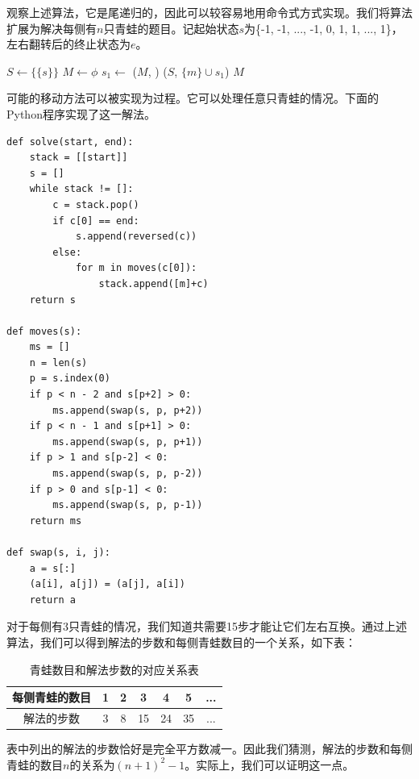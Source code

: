 \documentclass[b5paper]{ctexart}
\begin{document}
观察上述算法，它是尾递归的，因此可以较容易地用命令式方式实现。我们将算法扩展为解决每侧有$n$只青蛙的题目。记起始状态$s$为\{-1, -1, ..., -1, 0, 1, 1, ..., 1\}，左右翻转后的终止状态为$e$。

\begin{algorithmic}[1]
  \State $S \gets \{\{s\}\}$
  \State $M \gets \phi$
    \State $s_1 \gets$ 
      \State {}($M$, )
    \Else
        \State {}($S$, $\{m\} \cup s_1$)
      \EndFor
    \EndIf
  \EndWhile
  \State \Return $M$
\EndFunction
\end{algorithmic}

可能的移动方法可以被实现为过程。它可以处理任意只青蛙的情况。下面的Python程序实现了这一解法。

\lstset{language=Python}
\begin{lstlisting}
def solve(start, end):
    stack = [[start]]
    s = []
    while stack != []:
        c = stack.pop()
        if c[0] == end:
            s.append(reversed(c))
        else:
            for m in moves(c[0]):
                stack.append([m]+c)
    return s

def moves(s):
    ms = []
    n = len(s)
    p = s.index(0)
    if p < n - 2 and s[p+2] > 0:
        ms.append(swap(s, p, p+2))
    if p < n - 1 and s[p+1] > 0:
        ms.append(swap(s, p, p+1))
    if p > 1 and s[p-2] < 0:
        ms.append(swap(s, p, p-2))
    if p > 0 and s[p-1] < 0:
        ms.append(swap(s, p, p-1))
    return ms

def swap(s, i, j):
    a = s[:]
    (a[i], a[j]) = (a[j], a[i])
    return a
\end{lstlisting}

对于每侧有3只青蛙的情况，我们知道共需要15步才能让它们左右互换。通过上述算法，我们可以得到解法的步数和每侧青蛙数目的一个关系，如下表：

\begin{table}[htbp]
\centering
\begin{tabular}{c|c|c|c|c|c|c}
每侧青蛙的数目 & 1 & 2 & 3  & 4  & 5 & ... \\
\hline
解法的步数 & 3 & 8 & 15 & 24 & 35 & ...
\end{tabular}
\caption{青蛙数目和解法步数的对应关系表} \label{tab:leap-frog-n-steps}
\end{table}

表中列出的解法的步数恰好是完全平方数减一。因此我们猜测，解法的步数和每侧青蛙的数目$n$的关系为$(n+1)^2 - 1$。实际上，我们可以证明这一点。
\end{document}
